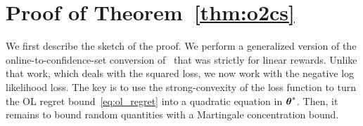 
\vspace{-5pt}
\section{Proof of Theorem~\ref{thm:o2cs}}
\vspace{-5pt}
%
We first describe the sketch of the proof.
We perform a generalized version of the online-to-confidence-set conversion of~\citet[Theorem 1]{ay12online} that was strictly for linear rewards. 
Unlike that work, which deals with the squared loss, we now work with the negative log likelihood loss.
The key is to use the strong-convexity of the loss function to turn the OL regret bound~\eqref{eq:ol_regret} into a quadratic equation in ${{\boldsymbol \theta}}^*$. 
Then, it remains to bound random quantities with a Martingale concentration bound.
%
\vspace{-5pt}
